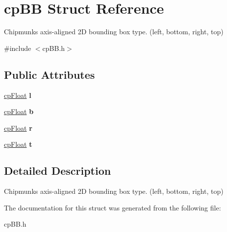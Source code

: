 \hypertarget{structcp_b_b}{}\section{cp\+B\+B Struct Reference}
\label{structcp_b_b}


Chipmunk\textquotesingle{}s axis-\/aligned 2\+D bounding box type. (left, bottom, right, top)  




{\ttfamily \#include $<$cp\+B\+B.\+h$>$}

\subsection*{Public Attributes}
\begin{DoxyCompactItemize}
\item 
\hypertarget{structcp_b_b_a6f88af28bf75a4ddfd0115fbd24f27ab}{}\hyperlink{group__basic_types_gac1ed65573e035bf892505768c852d8d3}{cp\+Float} {\bfseries l}\label{structcp_b_b_a6f88af28bf75a4ddfd0115fbd24f27ab}

\item 
\hypertarget{structcp_b_b_a8bdd6bf0baf92571d31a1ab85e63a183}{}\hyperlink{group__basic_types_gac1ed65573e035bf892505768c852d8d3}{cp\+Float} {\bfseries b}\label{structcp_b_b_a8bdd6bf0baf92571d31a1ab85e63a183}

\item 
\hypertarget{structcp_b_b_a552ee5c6597e79313bd5c85e7c6557af}{}\hyperlink{group__basic_types_gac1ed65573e035bf892505768c852d8d3}{cp\+Float} {\bfseries r}\label{structcp_b_b_a552ee5c6597e79313bd5c85e7c6557af}

\item 
\hypertarget{structcp_b_b_aee66985512eb137134d15ee6ac343bcd}{}\hyperlink{group__basic_types_gac1ed65573e035bf892505768c852d8d3}{cp\+Float} {\bfseries t}\label{structcp_b_b_aee66985512eb137134d15ee6ac343bcd}

\end{DoxyCompactItemize}


\subsection{Detailed Description}
Chipmunk\textquotesingle{}s axis-\/aligned 2\+D bounding box type. (left, bottom, right, top) 

The documentation for this struct was generated from the following file\+:\begin{DoxyCompactItemize}
\item 
cp\+B\+B.\+h\end{DoxyCompactItemize}
